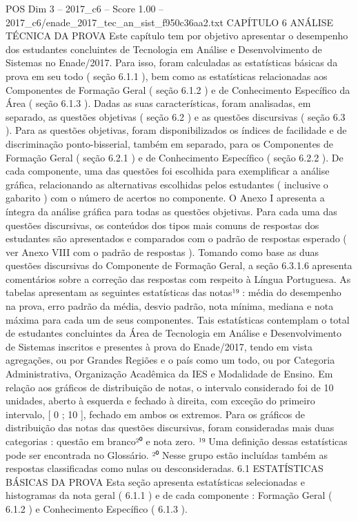 \begin{textsample}{POS Dim 3 – 2017\_c6 – Score 1.00 – 2017\_c6/enade\_2017\_tec\_an\_sist\_f950c36aa2.txt}  \label{ex:f3_pos_200}
CAPÍTULO 6 ANÁLISE TÉCNICA DA PROVA Este capítulo tem por objetivo apresentar o desempenho dos estudantes concluintes de Tecnologia em Análise e Desenvolvimento de Sistemas no Enade/2017.
Para isso, foram calculadas as estatísticas básicas da prova em seu todo ( seção 6.1.1 ), bem como as estatísticas relacionadas aos Componentes de Formação Geral ( seção 6.1.2 ) e de Conhecimento Específico da Área ( seção 6.1.3 ).
Dadas as suas características, foram analisadas, em separado, as questões objetivas ( seção 6.2 ) e as questões discursivas ( seção 6.3 ).
Para as questões objetivas, foram disponibilizados os índices de facilidade e de discriminação ponto-bisserial, também em separado, para os Componentes de Formação Geral ( seção 6.2.1 ) e de Conhecimento Específico ( seção 6.2.2 ).
De cada componente, uma das questões foi escolhida para exemplificar a análise gráfica, relacionando as alternativas escolhidas pelos estudantes ( inclusive o gabarito ) com o número de acertos no componente.
O Anexo I apresenta a íntegra da análise gráfica para todas as questões objetivas.
Para cada uma das questões discursivas, os conteúdos dos tipos mais comuns de respostas dos estudantes são apresentados e comparados com o padrão de respostas esperado ( ver Anexo VIII com o padrão de respostas ).
Tomando como base as duas questões discursivas do Componente de Formação Geral, a seção 6.3.1.6 apresenta comentários sobre a correção das respostas com respeito à Língua Portuguesa.
As tabelas apresentam as seguintes estatísticas das notas¹⁹ : média do desempenho na prova, erro padrão da média, desvio padrão, nota mínima, mediana e nota máxima para cada um de seus componentes.
Tais estatísticas contemplam o total de estudantes concluintes da Área de Tecnologia em Análise e Desenvolvimento de Sistemas inscritos e presentes à prova do Enade/2017, tendo em vista agregações, ou por Grandes Regiões e o país como um todo, ou por Categoria Administrativa, Organização Acadêmica da IES e Modalidade de Ensino.
Em relação aos gráficos de distribuição de notas, o intervalo considerado foi de 10 unidades, aberto à esquerda e fechado à direita, com exceção do primeiro intervalo, [ 0 ; 10 ], fechado em ambos os extremos.
Para os gráficos de distribuição das notas das questões discursivas, foram consideradas mais duas categorias : questão em branco²⁰ e nota zero. ¹⁹ Uma definição dessas estatísticas pode ser encontrada no Glossário. ²⁰ Nesse grupo estão incluídas também as respostas classificadas como nulas ou desconsideradas. 6.1 ESTATÍSTICAS BÁSICAS DA PROVA Esta seção apresenta estatísticas selecionadas e histogramas da nota geral ( 6.1.1 ) e de cada componente : Formação Geral ( 6.1.2 ) e Conhecimento Específico ( 6.1.3 ).

\end{textsample}
